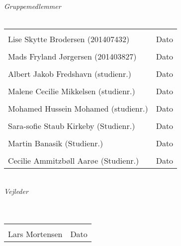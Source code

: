 \begin{vplace}[0.6]
{\large \textit{Gruppemedlemmer}}
\\
\\

\noindent \begin{tabular}{ll}
	\makebox[3.0in]{\hrulefill} & \makebox[1.5in]{\hrulefill}\\
	Lise Skytte Brodersen (201407432) & Dato\\[7ex]%
	\makebox[3in]{\hrulefill} & \makebox[1.5in]{\hrulefill}\\
	Mads Fryland J\o rgersen (201403827) & Dato\\[7ex]
	\makebox[3in]{\hrulefill} & \makebox[1.5in]{\hrulefill}\\
	Albert Jakob Fredshavn (studienr.) & Dato\\[7ex]
	\makebox[3in]{\hrulefill} & \makebox[1.5in]{\hrulefill}\\
	Malene Cecilie Mikkelsen (studienr.) & Dato\\[7ex]
	\makebox[3in]{\hrulefill} & \makebox[1.5in]{\hrulefill}\\
	Mohamed Hussein Mohamed (studienr.) & Dato\\[7ex]
	\makebox[3in]{\hrulefill} & \makebox[1.5in]{\hrulefill}\\
	Sara-sofie Staub Kirkeby (Studienr.) & Dato\\[7ex]
	\makebox[3in]{\hrulefill} & \makebox[1.5in]{\hrulefill}\\
	Martin Banasik (Studienr.) & Dato\\[7ex]
	\makebox[3in]{\hrulefill} & \makebox[1.5in]{\hrulefill}\\
	Cecilie Ammitzb\o ll Aar\o e (Studienr.) & Dato\\[7ex]
	
\end{tabular}
\\
{\large \textit{Vejleder}}
\\
\\
\\
\noindent \begin{tabular}{ll}
	\makebox[3.0in]{\hrulefill} & \makebox[1.5in]{\hrulefill}\\
	Lars Mortensen & Dato\\[8ex]
\end{tabular}
\end{vplace}